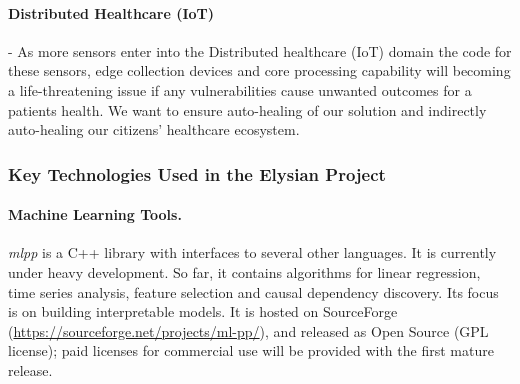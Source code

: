 \documentclass[a4paper,11pt]{article}
\newcommand{\project}[1]{\textbf{#1}\xspace}
\newcommand{\SECURITY}{\project{Elysian}}
\newcommand{\TheProject}{\SECURITY}
\begin{document}

\paragraph{Distributed Healthcare (IoT)}
\label{sec:health:IoT}
- As more sensors enter into the Distributed healthcare (IoT) domain the code for these sensors, edge collection devices and core processing capability will becoming a life-threatening issue if any vulnerabilities cause unwanted outcomes for a patients health. We want to ensure auto-healing of our solution and indirectly auto-healing our citizens' healthcare ecosystem.

\subsubsection{Key Technologies Used in the \TheProject{} Project}
\label{sect:key-technologies}

\paragraph{\SCCHshort{} Machine Learning Tools.}
\label{sec:mlpp}
\emph{mlpp} is a C++ library with interfaces to several other languages. It 
is currently under heavy development. So far, it contains algorithms for 
linear regression, time series analysis, feature selection and causal 
dependency discovery. Its focus is on building interpretable models. It is hosted 
on SourceForge (\url{https://sourceforge.net/projects/ml-pp/}), and released 
as Open Source (GPL license); paid licenses for commercial use will be provided
with the first mature release.
\end{document}
